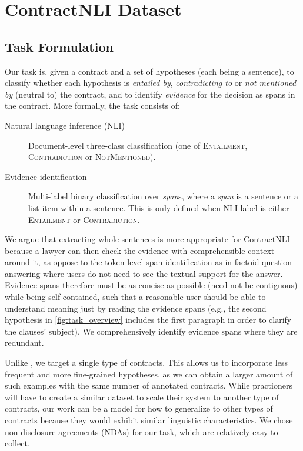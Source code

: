 \section{ContractNLI Dataset}\label{sec:dataset}

\subsection{Task Formulation}\label{sec:system-formulation}

Our task is, given a contract and a set of hypotheses (each being a sentence), to classify whether each hypothesis is \emph{entailed by}, \emph{contradicting to} or \emph{not mentioned by} (neutral to) the contract, and to identify \emph{evidence} for the decision as spans in the contract.
More formally, the task consists of:
\begin{description}
    \item[Natural language inference (NLI)] Document-level three-class classification (one of \textsc{Entailment}, \textsc{Contradiction} or \textsc{NotMentioned}).
    \item[Evidence identification] Multi-label binary classification over \emph{span}s, where a \emph{span} is a sentence or a list item within a sentence. This is only defined when NLI label is either \textsc{Entailment} or \textsc{Contradiction}.
\end{description}
We argue that extracting whole sentences is more appropriate for ContractNLI because a lawyer can then check the evidence with comprehensible context around it, as oppose to the token-level span identification as in factoid question answering where users do not need to see the textual support for the answer.
Evidence spans therefore must be as concise as possible (need not be contiguous) while being self-contained, such that a reasonable user should be able to understand meaning just by reading the evidence spans (e.g., the second hypothesis in \cref{fig:task_overview} includes the first paragraph in order to clarify the clauses' subject).
We comprehensively identify evidence spans where they are redundant.

Unlike \cite{hendrycks_cuad_2021}, we target a single type of contracts.
This allows us to incorporate less frequent and more fine-grained hypotheses, as we can obtain a larger amount of such examples with the same number of annotated contracts.
While practioners will have to create a similar dataset to scale their system to another type of contracts, our work can be a model for how to generalize to other types of contracts because they would exhibit similar linguistic characteristics.
We chose non-disclosure agreements (NDAs) for our task, which are relatively easy to collect.


